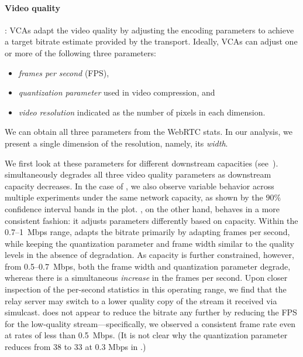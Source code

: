 \paragraph{Video quality}: VCAs adapt the video quality by adjusting the
encoding parameters to achieve a target bitrate estimate provided by the
transport. Ideally, VCAs can adjust one or more of the following three
parameters: 
\begin{itemize}
    \itemsep=-1pt
    \item \emph{frames per second} (FPS), 
    \item \textit{quantization parameter} used in video compression, and  
    \item \textit{video resolution} indicated as the number of pixels in each dimension. 
\end{itemize}
\noindent
We can obtain all three
parameters from the WebRTC stats. In our analysis, we present a single
dimension of the resolution, namely, its \textit{width}. 

We first look at these parameters for different downstream 
capacities
(see~).
\teamsbrowser simultaneously degrades all three video quality parameters as
downstream capacity decreases. In the case of \teamsbrowser, we also observe
variable behavior across multiple experiments under the same network capacity,
as shown by the $90\%$ confidence interval bands in the plot. \meet, on the
other hand, behaves in a more consistent fashion: it adjusts parameters
differently based on capacity. Within the  0.7--1~Mbps range, \meet adapts the
bitrate primarily by adapting {frames per second}, while keeping the
{quantization parameter} and {frame width} similar to the quality levels in
the absence of degradation. As capacity is further constrained, however,
from 0.5--0.7~Mbps, both the {frame width} and {quantization parameter}
degrade, whereas there is a simultaneous {\em increase} in the frames per
second. Upon closer inspection of the per-second statistics in this operating
range, we find that the relay server may switch to a lower quality copy of the
stream it received via {simulcast}. \meet does not appear to reduce the
bitrate any further by reducing the FPS for the low-quality
stream---specifically, we observed a consistent frame rate even at rates of
less than 0.5~Mbps. (It is not clear why the quantization parameter reduces
from 38 to 33 at 0.3 Mbps in \meet.)

